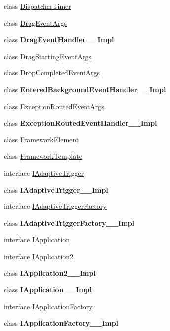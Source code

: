 \begin{DoxyCompactItemize}
\item 
class \hyperlink{class_windows_1_1_u_i_1_1_xaml_1_1_dispatcher_timer}{Dispatcher\+Timer}
\item 
class \hyperlink{class_windows_1_1_u_i_1_1_xaml_1_1_drag_event_args}{Drag\+Event\+Args}
\item 
class {\bfseries Drag\+Event\+Handler\+\_\+\+\_\+\+Impl}
\item 
class \hyperlink{class_windows_1_1_u_i_1_1_xaml_1_1_drag_starting_event_args}{Drag\+Starting\+Event\+Args}
\item 
class \hyperlink{class_windows_1_1_u_i_1_1_xaml_1_1_drop_completed_event_args}{Drop\+Completed\+Event\+Args}
\item 
class {\bfseries Entered\+Background\+Event\+Handler\+\_\+\+\_\+\+Impl}
\item 
class \hyperlink{class_windows_1_1_u_i_1_1_xaml_1_1_exception_routed_event_args}{Exception\+Routed\+Event\+Args}
\item 
class {\bfseries Exception\+Routed\+Event\+Handler\+\_\+\+\_\+\+Impl}
\item 
class \hyperlink{class_windows_1_1_u_i_1_1_xaml_1_1_framework_element}{Framework\+Element}
\item 
class \hyperlink{class_windows_1_1_u_i_1_1_xaml_1_1_framework_template}{Framework\+Template}
\item 
interface \hyperlink{interface_windows_1_1_u_i_1_1_xaml_1_1_i_adaptive_trigger}{I\+Adaptive\+Trigger}
\item 
class {\bfseries I\+Adaptive\+Trigger\+\_\+\+\_\+\+Impl}
\item 
interface \hyperlink{interface_windows_1_1_u_i_1_1_xaml_1_1_i_adaptive_trigger_factory}{I\+Adaptive\+Trigger\+Factory}
\item 
class {\bfseries I\+Adaptive\+Trigger\+Factory\+\_\+\+\_\+\+Impl}
\item 
interface \hyperlink{interface_windows_1_1_u_i_1_1_xaml_1_1_i_application}{I\+Application}
\item 
interface \hyperlink{interface_windows_1_1_u_i_1_1_xaml_1_1_i_application2}{I\+Application2}
\item 
class {\bfseries I\+Application2\+\_\+\+\_\+\+Impl}
\item 
class {\bfseries I\+Application\+\_\+\+\_\+\+Impl}
\item 
interface \hyperlink{interface_windows_1_1_u_i_1_1_xaml_1_1_i_application_factory}{I\+Application\+Factory}
\item 
class {\bfseries I\+Application\+Factory\+\_\+\+\_\+\+Impl}

\end{DoxyCompactItemize}
